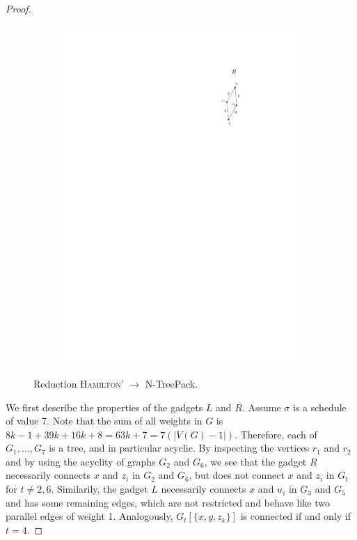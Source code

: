 \documentclass[runningheads]{llncs}
\newcommand{\set}[1]{\{ #1 \}}
\newcommand{\xxxNTP}{{\sc N-TreePack}}
\begin{document}
\begin{proof}
\begin{figure}[htpb]
\begin{subfigure}[b]{0.15\textwidth}
         \includegraphics[scale=0.90]{img/act-hamilton-cycle-c}
     \end{subfigure}
        \caption{Reduction \textsc{Hamilton'} $\rightarrow$ {\xxxNTP}.}
        \label{fig_act_hamilton_cycle}
\end{figure}

We first describe the properties of the gadgets $L$ and $R$. Assume $\sigma$ is a schedule of value 7. Note that the sum of all weights in $G$ is $8k - 1 + 39k + 16k + 8 = 63k + 7 = 7(|V(G) - 1|)$. Therefore, each of $G_{1}, \ldots, G_{7}$ is a tree, and in particular acyclic. By inspecting the vertices $r_1$ and $r_2$ and by using the acyclity of graphs $G_2$ and $G_6$, we see that the gadget $R$ necessarily connects $x$ and $z_i$ in $G_2$ and $G_6$, but does not connect $x$ and $z_i$ in $G_t$ for $t \neq 2,6$. Similarily, the gadget $L$ necessarily connects $x$ and $u_i$ in $G_3$ and $G_5$ and has some remaining edges, which are not restricted and behave like two parallel edges of weight 1. Analogously, $G_{t}[\set{x, y, z_k}]$ is connected if and only if $t = 4$.


\end{proof}
\end{document}
